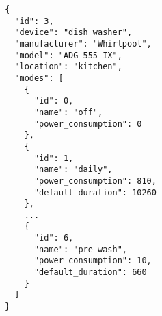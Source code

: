 \begin{lstlisting}[language=numbered,caption={JSON file describing the dish washer},label=code:appliance_dish_washer,float,floatplacement=H]
{
  "id": 3,
  "device": "dish washer",
  "manufacturer": "Whirlpool",
  "model": "ADG 555 IX",
  "location": "kitchen",
  "modes": [
    {
      "id": 0,
      "name": "off",
      "power_consumption": 0
    },
    {
      "id": 1,
      "name": "daily",
      "power_consumption": 810,
      "default_duration": 10260
    },
    ...	
    {
      "id": 6,
      "name": "pre-wash",
      "power_consumption": 10,
      "default_duration": 660
    }
  ]
}
\end{lstlisting}